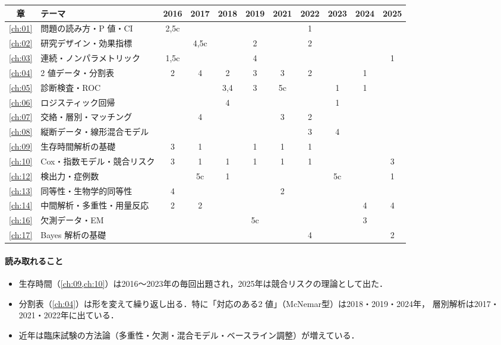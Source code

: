 \documentclass[a4paper,11pt,openany]{ltjsbook}
\begin{document}
\begin{center}\small
\setlength{\tabcolsep}{3.2pt}
\begin{tabular}{@{}clccccccccc@{}}
\toprule
章 & テーマ & 2016 & 2017 & 2018 & 2019 & 2021 & 2022 & 2023 & 2024 & 2025\\
\midrule
\ref{ch:01} & 問題の読み方・P 値・CI & 2,5c & & & & & 1 & & & \\
\ref{ch:02} & 研究デザイン・効果指標 & & 4,5c & & 2 & & 2 & & & \\
\ref{ch:03} & 連続・ノンパラメトリック & 1,5c & & & 4 & & & & & 1\\
\ref{ch:04} & 2 値データ・分割表 & 2 & 4 & 2 & 3 & 3 & 2 & & 1 & \\
\ref{ch:05} & 診断検査・ROC & & & 3,4 & 3 & 5c & & 1 & 1 & \\
\ref{ch:06} & ロジスティック回帰 & & & 4 & & & & 1 & & \\
\ref{ch:07} & 交絡・層別・マッチング & & 4 & & & 3 & 2 & & & \\
\ref{ch:08} & 縦断データ・線形混合モデル & & & & & & 3 & 4 & & \\
\ref{ch:09} & 生存時間解析の基礎 & 3 & 1 & & 1 & 1 & 1 & & & \\
\ref{ch:10} & Cox・指数モデル・競合リスク & 3 & 1 & 1 & 1 & 1 & 1 & & & 3\\
\ref{ch:12} & 検出力・症例数 & & 5c & 1 & & & & 5c & & 1\\
\ref{ch:13} & 同等性・生物学的同等性 & 4 & & & & 2 & & & & \\
\ref{ch:14} & 中間解析・多重性・用量反応 & 2 & 2 & & & & & & 4 & 4\\
\ref{ch:16} & 欠測データ・EM & & & & 5c & & & & 3 & \\
\ref{ch:17} & Bayes 解析の基礎 & & & & & & 4 & & & 2\\
\bottomrule
\end{tabular}
\end{center}

\paragraph{読み取れること}
\begin{itemize}
\item 生存時間（\cref{ch:09,ch:10}）は2016〜2023年の毎回出題され，2025年は競合リスクの理論として出た．
\item 分割表（\cref{ch:04}）は形を変えて繰り返し出る．特に「対応のある2 値」（McNemar型）は2018・2019・2024年，
      層別解析は2017・2021・2022年に出ている．
\item 近年は臨床試験の方法論（多重性・欠測・混合モデル・ベースライン調整）が増えている．
\end{itemize}
\end{document}
